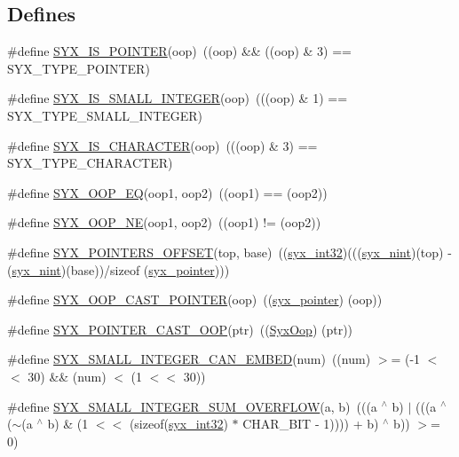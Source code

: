 \subsection*{Defines}
\begin{CompactItemize}
\item 
\#define \hyperlink{syx-types_8h_c3d7742cf3e6fe2ebda18c509a0ee172}{SYX\_\-IS\_\-POINTER}(oop)~((oop) \&\& ((oop) \& 3) == SYX\_\-TYPE\_\-POINTER)
\item 
\#define \hyperlink{syx-types_8h_521de84329f41e260c96d79b17f066a9}{SYX\_\-IS\_\-SMALL\_\-INTEGER}(oop)~(((oop) \& 1) == SYX\_\-TYPE\_\-SMALL\_\-INTEGER)
\item 
\#define \hyperlink{syx-types_8h_519a5430d5368974ee1ec05b10b11edf}{SYX\_\-IS\_\-CHARACTER}(oop)~(((oop) \& 3) == SYX\_\-TYPE\_\-CHARACTER)
\item 
\#define \hyperlink{syx-types_8h_11cbe8792a6a199aa5562be393851ab5}{SYX\_\-OOP\_\-EQ}(oop1, oop2)~((oop1) == (oop2))
\item 
\#define \hyperlink{syx-types_8h_77fa18bf2a99d480c1947546d2f4d3da}{SYX\_\-OOP\_\-NE}(oop1, oop2)~((oop1) != (oop2))
\item 
\#define \hyperlink{syx-types_8h_e109977ff8e34b7265d4442c9ec39560}{SYX\_\-POINTERS\_\-OFFSET}(top, base)~((\hyperlink{syx-types_8h_9f31c17555a2dfcf25da84b5c4a2e55b}{syx\_\-int32})(((\hyperlink{syx-types_8h_488ad2504ade19c761a3e2a1726b4781}{syx\_\-nint})(top) - (\hyperlink{syx-types_8h_488ad2504ade19c761a3e2a1726b4781}{syx\_\-nint})(base))/sizeof (\hyperlink{syx-types_8h_51c518ab1f082eb4330ca143afb1584f}{syx\_\-pointer})))
\item 
\#define \hyperlink{syx-types_8h_c1fcc0de09d041e08a21ae518c09037a}{SYX\_\-OOP\_\-CAST\_\-POINTER}(oop)~((\hyperlink{syx-types_8h_51c518ab1f082eb4330ca143afb1584f}{syx\_\-pointer}) (oop))
\item 
\#define \hyperlink{syx-types_8h_8efde12e307dd616a32f42327b3e80cc}{SYX\_\-POINTER\_\-CAST\_\-OOP}(ptr)~((\hyperlink{syx-types_8h_1121caba2d40b2ce090b640762744ccd}{SyxOop}) (ptr))
\item 
\#define \hyperlink{syx-types_8h_d51ca7a68a6122d41d94b97807b4b0d0}{SYX\_\-SMALL\_\-INTEGER\_\-CAN\_\-EMBED}(num)~((num) $>$= (-1 $<$$<$ 30) \&\& (num) $<$ (1 $<$$<$ 30))
\item 
\#define \hyperlink{syx-types_8h_4e849ad177c1b33faf9d4c5719361f77}{SYX\_\-SMALL\_\-INTEGER\_\-SUM\_\-OVERFLOW}(a, b)~(((a $^\wedge$ b) $|$ (((a $^\wedge$ ($\sim$(a $^\wedge$ b) \& (1 $<$$<$ (sizeof(\hyperlink{syx-types_8h_9f31c17555a2dfcf25da84b5c4a2e55b}{syx\_\-int32}) $\ast$ CHAR\_\-BIT - 1)))) + b) $^\wedge$ b)) $>$= 0)
$$
\end{CompactItemize}
